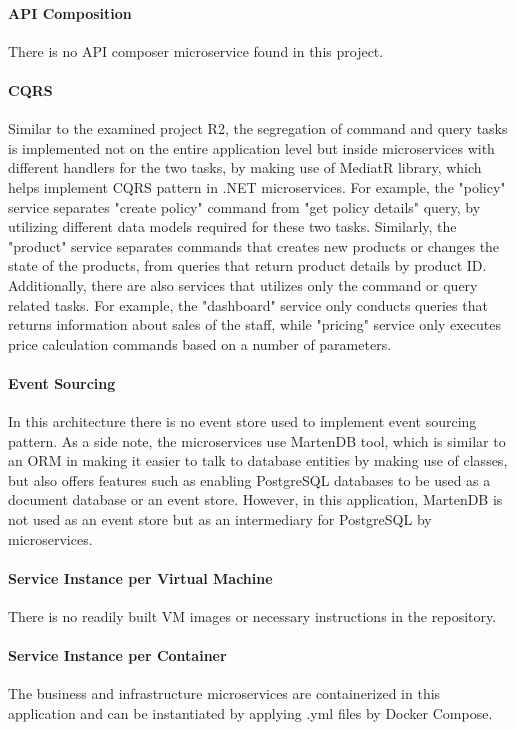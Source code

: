 \documentclass{Configuration_Files/PoliMi3i_thesis}
\begin{document}
\paragraph{API Composition} There is no API composer microservice found in this project.

\paragraph{CQRS} Similar to the examined project R2, the segregation of command and query tasks is implemented not on the entire application level but inside microservices with different handlers for the two tasks, by making use of MediatR library, which helps implement CQRS pattern in .NET microservices.
For example, the "policy" service separates "create policy" command from "get policy details" query, by utilizing different data models required for these two tasks.
Similarly, the "product" service separates commands that creates new products or changes the state of the products, from queries that return product details by product ID.
Additionally, there are also services that utilizes only the command or query related tasks.
For example, the "dashboard" service only conducts queries that returns information about sales of the staff, while "pricing" service only executes price calculation commands based on a number of parameters.

\paragraph{Event Sourcing} In this architecture there is no event store used to implement event sourcing pattern.
As a side note, the microservices use MartenDB\footnotemark[105] tool, which is similar to an ORM in making it easier to talk to database entities by making use of classes, but also offers features such as enabling PostgreSQL databases to be used as a document database or an event store.
However, in this application, MartenDB is not used as an event store but as an intermediary for PostgreSQL by microservices.

\paragraph{Service Instance per Virtual Machine} There is no readily built VM images or necessary instructions in the repository.

\paragraph{Service Instance per Container} The business and infrastructure microservices are containerized in this application and can be instantiated by applying .yml files by Docker Compose.
\end{document}
